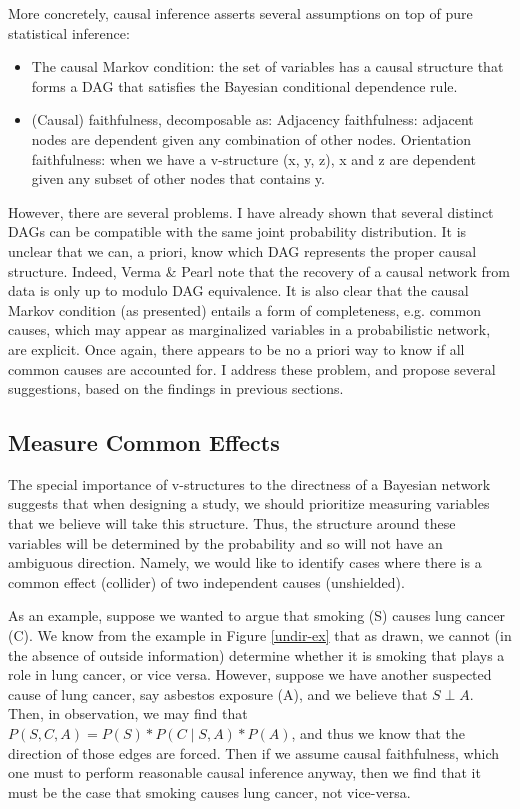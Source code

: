 \documentclass{article}
\begin{document}
	More concretely, causal inference asserts several assumptions on top of pure statistical inference\cite{ramsey2012adjacencyfaithfulness}:
	\begin{itemize}
		\item The causal Markov condition: the set of variables has a causal structure that forms a DAG that satisfies the Bayesian conditional dependence rule.
		\item (Causal) faithfulness, decomposable as:
			\subitem Adjacency faithfulness: adjacent nodes are dependent given any combination of other nodes.
			\subitem Orientation faithfulness: when we have a v-structure (x, y, z), x and z are dependent given any subset of other nodes that contains y.
	\end{itemize}
	However, there are several problems.
	I have already shown that several distinct DAGs can be compatible with the same joint probability distribution.
	It is unclear that we can, a priori, know which DAG represents the proper causal structure.
	Indeed, Verma \& Pearl note that the recovery of a causal network from data is only up to modulo DAG equivalence\cite{verma2013equivalence}.
	It is also clear that the causal Markov condition (as presented) entails a form of completeness, e.g. common causes, which may appear as marginalized variables in a probabilistic network, are explicit.
	Once again, there appears to be no a priori way to know if all common causes are accounted for.
	I address these problem, and propose several suggestions, based on the findings in previous sections.
	
	\subsection{Measure Common Effects}
	The special importance of v-structures to the directness of a Bayesian network suggests that when designing a study, we should prioritize measuring variables that we believe will take this structure.
	Thus, the structure around these variables will be determined by the probability and so will not have an ambiguous direction.
	Namely, we would like to identify cases where there is a common effect (collider) of two independent causes (unshielded).
	
	As an example, suppose we wanted to argue that smoking (S) causes lung cancer (C).
	We know from the example in Figure \ref{undir-ex} that as drawn, we cannot (in the absence of outside information) determine whether it is smoking that plays a role in lung cancer, or vice versa.
	However, suppose we have another suspected cause of lung cancer, say asbestos exposure (A), and we believe that $S \perp A$.
	Then, in observation, we may find that $P(S, C, A) = P(S)*P(C \mid S, A)*P(A)$, and thus we know that the direction of those edges are forced.
	Then if we assume causal faithfulness, which one must to perform reasonable causal inference anyway, then we find that it must be the case that smoking causes lung cancer, not vice-versa.
	
\end{document}
